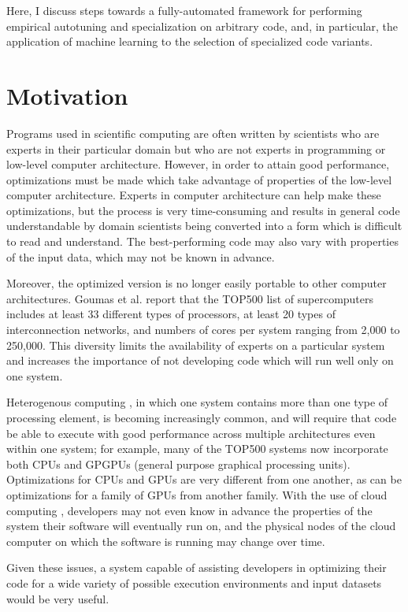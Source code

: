 \documentclass[msthesis,justified,copyright,final,numbers,sort&compress,
gsmodern,amstex,natbib]{uothesis}
\begin{document}
Here, I discuss steps towards a fully-automated framework for performing empirical autotuning and specialization on arbitrary code, and, in particular, the application of machine learning to the selection of specialized code variants.

\section{Motivation}

Programs used in scientific computing are often written by scientists who are experts in their particular domain but who are not experts in programming or low-level computer architecture. However, in order to attain good performance, optimizations must be made which take advantage of properties of the low-level computer architecture. Experts in computer architecture can help make these optimizations, but the process is very time-consuming and results in general code understandable by domain scientists being converted into a form which is difficult to read and understand. The best-performing code may also vary with properties of the input data, which may not be known in advance.

Moreover, the optimized version is no longer easily portable to other computer architectures. Goumas et al. \cite{adapt} report that the TOP500 list of supercomputers \cite{top500} includes at least 33 different types of processors, at least 20 types of interconnection networks, and numbers of cores per system ranging from 2,000 to 250,000. This diversity limits the availability of experts on a particular system and increases the importance of not developing code which will run well only on one system.

Heterogenous computing \cite{hetero}, in which one system contains more than one type of processing element, is becoming increasingly common, and will require that code be able to execute with good performance across multiple architectures even within one system; for example, many of the TOP500 systems now incorporate both CPUs and GPGPUs (general purpose graphical processing units). Optimizations for CPUs and GPUs are very different from one another, as can be optimizations for a family of GPUs from another family. With the use of cloud computing \cite{cloud}, developers may not even know in advance the properties of the system their software will eventually run on, and the physical nodes of the cloud computer on which the software is running may change over time.

Given these issues, a system capable of assisting developers in optimizing their code for a wide variety of possible execution environments and input datasets would be very useful. 
\end{document}
